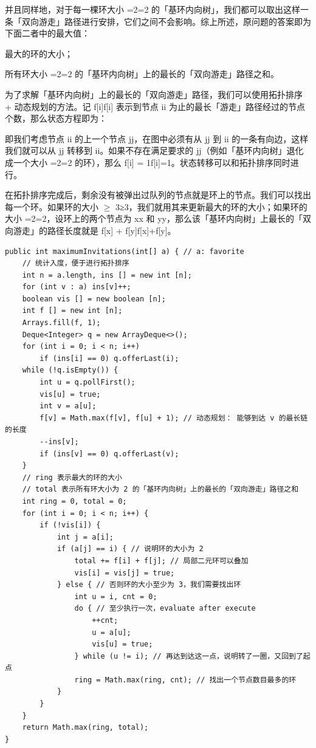 \documentclass[9pt, b5paaper]{book}
\begin{document}
\begin{enumerate}
并且同样地，对于每一棵环大小 =2=2 的「基环内向树」，我们都可以取出这样一条「双向游走」路径进行安排，它们之间不会影响。综上所述，原问题的答案即为下面二者中的最大值：

最大的环的大小；

所有环大小 =2=2 的「基环内向树」上的最长的「双向游走」路径之和。

为了求解「基环内向树」上的最长的「双向游走」路径，我们可以使用拓扑排序 + 动态规划的方法。记 f[i]f[i] 表示到节点 ii 为止的最长「游走」路径经过的节点个数，那么状态方程即为：

即我们考虑节点 ii 的上一个节点 jj，在图中必须有从 jj 到 ii 的一条有向边，这样我们就可以从 jj 转移到 ii。如果不存在满足要求的 jj（例如「基环内向树」退化成一个大小 =2=2 的环），那么 f[i] = 1f[i]=1。状态转移可以和拓扑排序同时进行。

在拓扑排序完成后，剩余没有被弹出过队列的节点就是环上的节点。我们可以找出每一个环。如果环的大小 $\ge$ 3≥3，我们就用其来更新最大的环的大小；如果环的大小 =2=2，设环上的两个节点为 xx 和 yy，那么该「基环内向树」上最长的「双向游走」的路径长度就是 f[x] + f[y]f[x]+f[y]。

\begin{verbatim}
public int maximumInvitations(int[] a) { // a: favorite
    // 统计入度，便于进行拓扑排序
    int n = a.length, ins [] = new int [n];
    for (int v : a) ins[v]++;
    boolean vis [] = new boolean [n];
    int f [] = new int [n];
    Arrays.fill(f, 1);
    Deque<Integer> q = new ArrayDeque<>();
    for (int i = 0; i < n; i++) 
        if (ins[i] == 0) q.offerLast(i); 
    while (!q.isEmpty()) {
        int u = q.pollFirst();
        vis[u] = true;
        int v = a[u];
        f[v] = Math.max(f[v], f[u] + 1); // 动态规划： 能够到达 v 的最长链的长度
        --ins[v];
        if (ins[v] == 0) q.offerLast(v);
    }
    // ring 表示最大的环的大小
    // total 表示所有环大小为 2 的「基环内向树」上的最长的「双向游走」路径之和
    int ring = 0, total = 0;
    for (int i = 0; i < n; i++) {
        if (!vis[i]) {
            int j = a[i];
            if (a[j] == i) { // 说明环的大小为 2
                total += f[i] + f[j]; // 局部二元环可以叠加
                vis[i] = vis[j] = true;
            } else { // 否则环的大小至少为 3，我们需要找出环
                int u = i, cnt = 0;
                do { // 至少执行一次，evaluate after execute
                    ++cnt;
                    u = a[u];
                    vis[u] = true;
                } while (u != i); // 再达到达这一点，说明转了一圈，又回到了起点
                ring = Math.max(ring, cnt); // 找出一个节点数目最多的环
            }
        }
    }
    return Math.max(ring, total);
}
\end{verbatim}
\end{enumerate}
\end{document}
